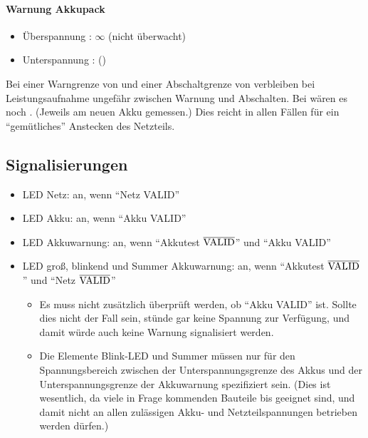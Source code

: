 \paragraph{Warnung Akkupack}
\begin{itemize}
	\item Überspannung : $\infty$ (nicht überwacht)
	\item Unterspannung :  ()
\end{itemize}

Bei einer Warngrenze von  und einer Abschaltgrenze von  verbleiben bei  Leistungsaufnahme ungefähr  zwischen Warnung und Abschalten. Bei  wären es noch \ca {}. (Jeweils am neuen Akku gemessen.) Dies reicht in allen Fällen für ein "`gemütliches"' Anstecken des Netzteils.


\subsection{Signalisierungen}

\begin{itemize}
	\item LED Netz: an, wenn "`Netz VALID"'
	\item LED Akku: an, wenn "`Akku VALID"'
	\item LED Akkuwarnung: an, wenn "`Akkutest $\mathrm{\overline{VALID}}$"' und "`Akku VALID"'
	\item LED groß, blinkend und Summer Akkuwarnung: an, wenn "`Akkutest $\mathrm{\overline{VALID}}$"' und "`Netz $\mathrm{\overline{VALID}}$"'\\
		\begin{itemize}
			\item Es muss nicht zusätzlich überprüft werden, ob "`Akku VALID"' ist. Sollte dies nicht der Fall sein, stünde gar keine Spannung zur Verfügung, und damit würde auch keine Warnung signalisiert werden.
			\item Die Elemente Blink-LED und Summer müssen nur für den Spannungsbereich zwischen der Unterspannungsgrenze des Akkus und der Unterspannungsgrenze der Akkuwarnung spezifiziert sein. (Dies ist wesentlich, da viele in Frage kommenden Bauteile bis  geeignet sind, und damit nicht an allen zulässigen Akku- und Netzteilspannungen betrieben werden dürfen.)
		\end{itemize}
\end{itemize}






